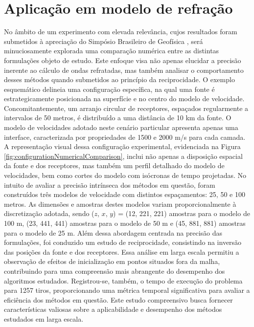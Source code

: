 \section{Aplicação em modelo de refração}

No âmbito de um experimento com elevada relevância, cujos resultados foram submetidos à apreciação do Simpósio Brasileiro de Geofísica \cite{alves2022refraction}, será minuciosamente explorada uma comparação numérica entre as distintas formulações objeto de estudo. Este enfoque visa não apenas elucidar a precisão inerente ao cálculo de ondas refratadas, mas também analisar o comportamento desses métodos quando submetidos ao princípio da reciprocidade. O exemplo esquemático delineia uma configuração específica, na qual uma fonte é estrategicamente posicionada na superfície e no centro do modelo de velocidade. Concomitantemente, um arranjo circular de receptores, espaçados regularmente a intervalos de 50 metros, é distribuído a uma distância de 10 km da fonte. O modelo de velocidades adotado neste cenário particular apresenta apenas uma interface, caracterizada por propriedades de 1500 e 2000 m/s para cada camada. A representação visual dessa configuração experimental, evidenciada na Figura \ref{fig:configurationNumericalComparison}, inclui não apenas a disposição espacial da fonte e dos receptores, mas também um perfil detalhado do modelo de velocidades, bem como cortes do modelo com isócronas de tempo projetadas. No intuito de avaliar a precisão intrínseca dos métodos em questão, foram construídos três modelos de velocidade com distintos espaçamentos: 25, 50 e 100 metros. As dimensões e amostras destes modelos variam proporcionalmente à discretização adotada, sendo ($z$, $x$, $y$) = (12, 221, 221) amostras para o modelo de 100 m, (23, 441, 441) amostras para o modelo de 50 m e (45, 881, 881) amostras para o modelo de 25 m. Além dessa abordagem centrada na precisão das formulações, foi conduzido um estudo de reciprocidade, consistindo na inversão das posições da fonte e dos receptores. Essa análise em larga escala permitiu a observação de efeitos de inicialização em pontos situados fora da malha, contribuindo para uma compreensão mais abrangente do desempenho dos algoritmos estudados. Registrou-se, também, o tempo de execução do problema para 1257 tiros, proporcionando uma métrica temporal significativa para avaliar a eficiência dos métodos em questão. Este estudo compreensivo busca fornecer características valiosas sobre a aplicabilidade e desempenho dos métodos estudados em larga escala.


